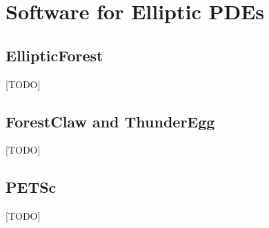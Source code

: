 \section{Software for Elliptic PDEs}

\subsection{EllipticForest}
\label{sub:elliptic-forest}

[TODO]

\subsection{ForestClaw and ThunderEgg}

[TODO]

\subsection{PETSc}

[TODO]
